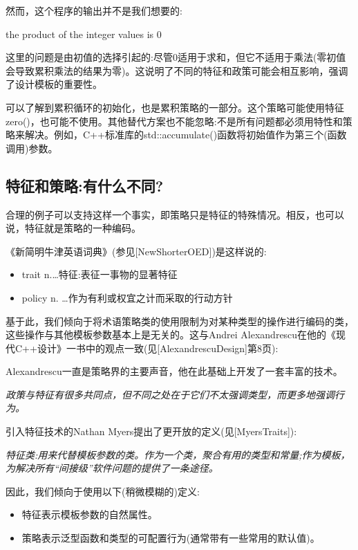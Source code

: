 然而，这个程序的输出并不是我们想要的:

\begin{shell}
the product of the integer values is 0
\end{shell}

这里的问题是由初值的选择引起的:尽管0适用于求和，但它不适用于乘法(零初值会导致累积乘法的结果为零)。这说明了不同的特征和政策可能会相互影响，强调了设计模板的重要性。

可以了解到累积循环的初始化，也是累积策略的一部分。这个策略可能使用特征zero()，也可能不使用。其他替代方案也不能忽略:不是所有问题都必须用特性和策略来解决。例如，C++标准库的std::accumulate()函数将初始值作为第三个(函数调用)参数。

\subsection{特征和策略:有什么不同?}

合理的例子可以支持这样一个事实，即策略只是特征的特殊情况。相反，也可以说，特征就是策略的一种编码。

《新简明牛津英语词典》(参见[NewShorterOED])是这样说的:

\begin{itemize}
\item 
trait n.…特征:表征一事物的显著特征

\item 
policy n. …作为有利或权宜之计而采取的行动方针
\end{itemize}

基于此，我们倾向于将术语策略类的使用限制为对某种类型的操作进行编码的类，这些操作与其他模板参数基本上是无关的。这与Andrei Alexandrescu在他的《现代C++设计》一书中的观点一致(见[AlexandrescuDesign]第8页):

\begin{notice}Alexandrescu一直是策略界的主要声音，他在此基础上开发了一套丰富的技术。
\end{notice}

\textit{政策与特征有很多共同点，但不同之处在于它们不太强调类型，而更多地强调行为。}

引入特征技术的Nathan Myers提出了更开放的定义(见[MyersTraits]):

\textit{特征类:用来代替模板参数的类。作为一个类，聚合有用的类型和常量;作为模板，为解决所有“间接级”软件问题的提供了一条途径。}

因此，我们倾向于使用以下(稍微模糊的)定义:

\begin{itemize}
\item 
特征表示模板参数的自然属性。

\item 
策略表示泛型函数和类型的可配置行为(通常带有一些常用的默认值)。
\end{itemize}

